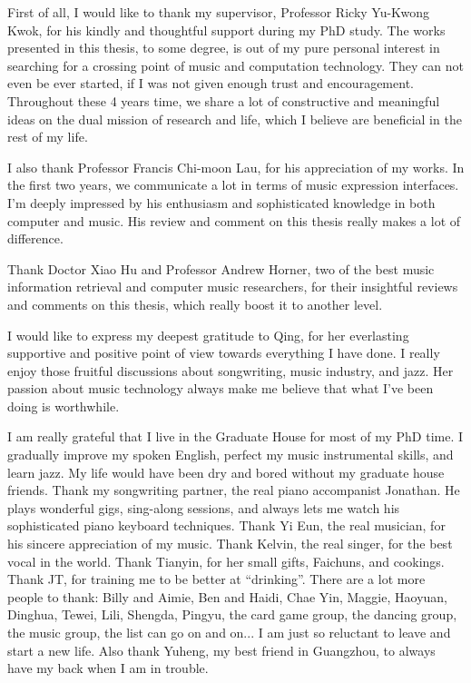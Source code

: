 \begin{acknowledgements}

First of all, I would like to thank my supervisor, Professor Ricky Yu-Kwong Kwok, for his kindly and thoughtful support during my PhD study. The works presented in this thesis, to some degree, is out of my pure personal interest in searching for a crossing point of music and computation technology. They can not even be ever started, if I was not given enough trust and encouragement. Throughout these 4 years time, we share a lot of constructive and meaningful ideas on the dual mission of research and life, which I believe are beneficial in the rest of my life.

I also thank Professor Francis Chi-moon Lau, for his appreciation of my works. In the first two years, we communicate a lot in terms of music expression interfaces. I'm deeply impressed by his enthusiasm and sophisticated knowledge in both computer and music. His review and comment on this thesis really makes a lot of difference.

Thank Doctor Xiao Hu and Professor Andrew Horner, two of the best music information retrieval and computer music researchers, for their insightful reviews and comments on this thesis, which really boost it to another level.

I would like to express my deepest gratitude to Qing, for her everlasting supportive and positive point of view towards everything I have done. I really enjoy those fruitful discussions about songwriting, music industry, and jazz. Her passion about music technology always make me believe that what I've been doing is worthwhile.

I am really grateful that I live in the Graduate House for most of my PhD time. I gradually improve my spoken English, perfect my music instrumental skills, and learn jazz. My life would have been dry and bored without my graduate house friends. Thank my songwriting partner, the real piano accompanist Jonathan. He plays wonderful gigs, sing-along sessions, and always lets me watch his sophisticated piano keyboard techniques. Thank Yi Eun, the real musician, for his sincere appreciation of my music. Thank Kelvin, the real singer, for the best vocal in the world. Thank Tianyin, for her small gifts, Faichuns, and cookings. Thank JT, for training me to be better at ``drinking''. There are a lot more people to thank: Billy and Aimie, Ben and Haidi, Chae Yin, Maggie, Haoyuan, Dinghua, Tewei, Lili, Shengda, Pingyu, the card game group, the dancing group, the music group, the list can go on and on... I am just so reluctant to leave and start a new life. Also thank Yuheng, my best friend in Guangzhou, to always have my back when I am in trouble.


\end{acknowledgements}
